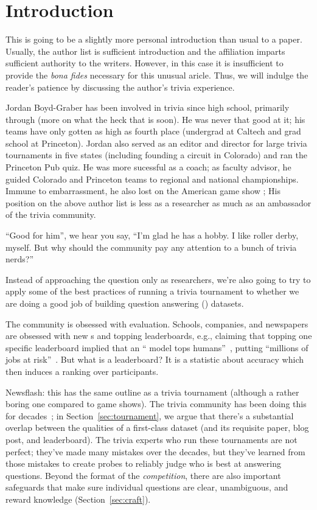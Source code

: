 

\section{Introduction}


This is going to be a slightly more personal introduction than usual
to a paper.
Usually, the author list is sufficient introduction and the
affiliation imparts sufficient authority to the writers.
However, in this case it is insufficient to provide the \textit{bona
  fides} necessary for this unusual aricle.
Thus, we will indulge the reader's patience by discussing the 
author's trivia experience.

Jordan Boyd-Graber has been involved in trivia since high school,
primarily through \qb{} (more on what the heck that is soon).  
He was never that good at it; his teams have only gotten as high as
fourth place (undergrad at Caltech and grad school at Princeton).
Jordan also served as an editor and director for large trivia
tournaments in five states (including founding a circuit in Colorado)
and ran the Princeton Pub quiz.
He was more sucessful as a coach; as faculty advisor, he guided
Colorado and Princeton teams to regional and national championships.
Immune to embarrassment, he also lost on the American game show \jeopardy{};  
His position on the above author list is less as a  researcher as
much as an ambassador of the trivia community.


``Good for him'', we hear you say, ``I'm glad he has a hobby.  I like
roller derby, myself.  But why should the  community pay any
attention to a bunch of trivia nerds?''

Instead of approaching the question only as  researchers, we're also going to try to apply some of the best practices of running a trivia tournament to whether we are doing a good job of building question answering () datasets.

The \qa{} community is obsessed with evaluation.
Schools, companies, and newspapers are obsessed with new s and
topping leaderboards, e.g., claiming that topping one specific leaderboard implied that an `` model tops humans''~\citep{najberg-18}, putting ``millions of jobs at risk''~\cite{cuthbertson-18}.
But what is a leaderboard? 
It is a statistic about \qa{} accuracy which then induces a ranking over participants.

Newsflash: this has the same outline as a trivia tournament (although a rather boring one compared to game shows).  
The trivia community has been doing this for decades~\cite{jennings-06}; in
Section~\ref{sec:tournament}, we argue that there's a substantial
overlap between the qualities of a first-class  dataset (and
its requisite paper, blog post, and leaderboard).
The trivia experts who run these tournaments are not perfect; they've
made many mistakes over the decades, but they've learned from those
mistakes to create probes to reliably judge who is best at answering
questions.
Beyond the format of the \emph{competition}, there are also important
safeguards that make sure individual questions are clear, unambiguous,
and reward knowledge (Section~\ref{sec:craft}).

